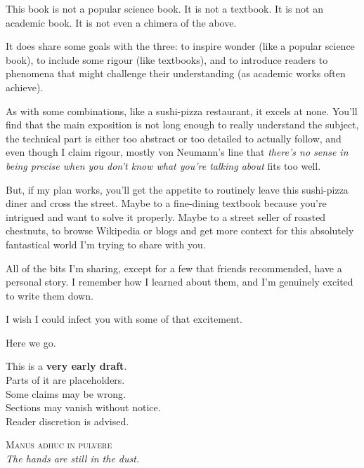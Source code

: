 \begin{tcolorbox}[
    colback=white,
    colframe=gray!40,
    boxrule=0.5pt,
    arc=1mm,
    left=10pt,
    right=10pt,
    top=10pt,
    bottom=10pt,
    width=\textwidth,
    enlarge left by=0mm,
    sharp corners=south,
    breakable
]
\setlength{\parskip}{1em}

This book is not a popular science book. It is not a textbook. It is not an academic book. It is not even a chimera of the above.  

It does share some goals with the three: to inspire wonder (like a popular science book), to include some rigour (like textbooks), and to introduce readers to phenomena that might challenge their understanding (as academic works often achieve).

As with some combinations, like a sushi-pizza restaurant, it excels at none.  
You'll find that the main exposition is not long enough to really understand the subject, the technical part is either too abstract or too detailed to actually follow, and even though I claim rigour, mostly von Neumann's line that \textit{there's no sense in being precise when you don't know what you're talking about} fits too well.

But, if my plan works, you'll get the appetite to routinely leave this sushi-pizza diner and cross the street. Maybe to a fine-dining textbook because you're intrigued and want to solve it properly. Maybe to a street seller of roasted chestnuts, to browse Wikipedia or blogs and get more context for this absolutely fantastical world I'm trying to share with you.

All of the bits I'm sharing, except for a few that friends recommended, have a personal story. I remember how I learned about them, and I'm genuinely excited to write them down.  

I wish I could infect you with some of that excitement.

Here we go.
\end{tcolorbox}


\begin{tcolorbox}[
    colback=red!5,
    colframe=red!60!black,
    boxrule=1pt,
    arc=0.5mm,
    left=10pt,
    right=10pt,
    top=10pt,
    bottom=10pt,
    width=\textwidth,
    sharp corners=south,
    breakable,
    title=\textbf{DRAFT WARNING}
]
\setlength{\parskip}{1em}

This is a \textbf{very early draft}.\\
Parts of it are placeholders.\\
Some claims may be wrong.\\
Sections may vanish without notice.\\
Reader discretion is advised.

\begin{center}
{\scshape Manus adhuc in pulvere}\\
\textit{The hands are still in the dust.}
\end{center}

\end{tcolorbox}
